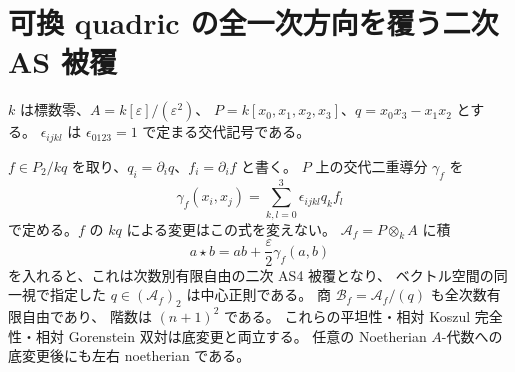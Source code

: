\section{可換 quadric の全一次方向を覆う二次 AS 被覆}
\label{sec:quadric-first-order-as}

$k$ は標数零、$A=k[\varepsilon]/(\varepsilon^2)$、
$P=k[x_0,x_1,x_2,x_3]$、$q=x_0x_3-x_1x_2$ とする。
$\epsilon_{ijkl}$ は $\epsilon_{0123}=1$ で定まる交代記号である。

\begin{proposition}
\label{prop:quadric-first-order-jacobian-cover}
$f\in P_2/kq$ を取り、$q_i=\partial_iq$、$f_i=\partial_if$ と書く。
$P$ 上の交代二重導分 $\gamma_f$ を
\[
 \gamma_f(x_i,x_j)=\sum_{k,l=0}^3\epsilon_{ijkl}q_kf_l
\]
で定める。$f$ の $kq$ による変更はこの式を変えない。
$\mathcal A_f=P\otimes_kA$ に積
\[
 a\star b=ab+\frac{\varepsilon}{2}\gamma_f(a,b)
\]
を入れると、これは次数別有限自由の二次 AS4 被覆となり、
ベクトル空間の同一視で指定した $q\in(\mathcal A_f)_2$ は中心正則である。
商 $\mathcal B_f=\mathcal A_f/(q)$ も全次数有限自由であり、
階数は $(n+1)^2$ である。
これらの平坦性・相対 Koszul 完全性・相対 Gorenstein 双対は底変更と両立する。
任意の Noetherian $A$-代数への底変更後にも左右 noetherian である。
\end{proposition}
